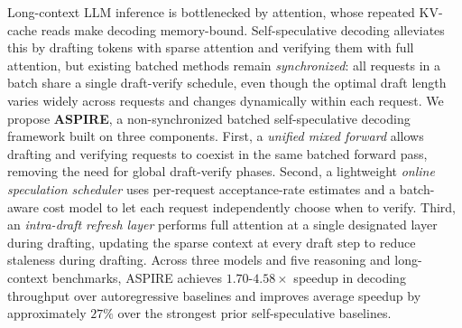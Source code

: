 Long-context LLM inference is bottlenecked by attention, whose repeated KV-cache reads make decoding memory-bound. Self-speculative decoding alleviates this by drafting tokens with sparse attention and verifying them with full attention, but existing batched methods remain \emph{synchronized}: all requests in a batch share a single draft-verify schedule, even though the optimal draft length varies widely across requests and changes dynamically within each request. We propose \textbf{ASPIRE}, a non-synchronized batched self-speculative decoding framework built on three components. First, a \emph{unified mixed forward} allows drafting and verifying requests to coexist in the same batched forward pass, removing the need for global draft-verify phases. Second, a lightweight \emph{online speculation scheduler} uses per-request acceptance-rate estimates and a batch-aware cost model to let each request independently choose when to verify. Third, an \emph{intra-draft refresh layer} performs full attention at a single designated layer during drafting, updating the sparse context at every draft step to reduce staleness during drafting. Across three models and five reasoning and long-context benchmarks, ASPIRE achieves $1.70$-$4.58\times$ speedup in decoding throughput over autoregressive baselines and improves average speedup by approximately $27\%$ over the strongest prior self-speculative baselines.
